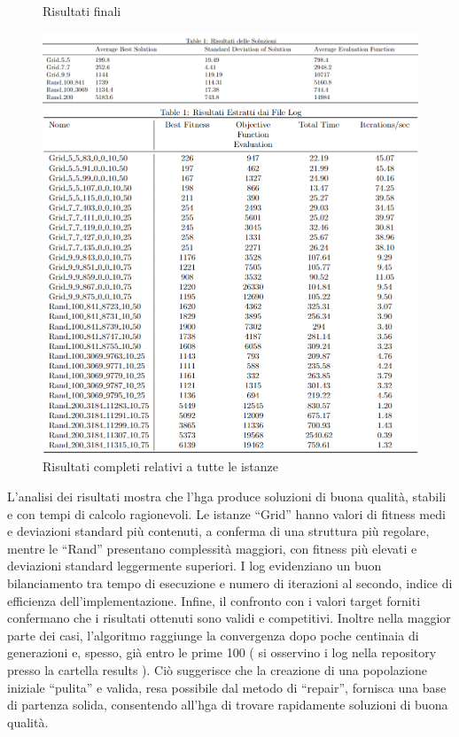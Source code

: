 \documentclass[12pt,a4paper,twoside]{article}
\begin{document}
\begin{figure}[H] 
    \centering
    \caption{Risultati finali}
    \includegraphics[width=\textwidth]{Screenshot 2025-03-03 120701.png} 
    \vspace{2pt} 
    \caption{Risultati completi relativi a tutte le istanze }
    \includegraphics[width=\textwidth]{Screenshot 2025-03-03 124139.png} 
\end{figure}
L’analisi dei risultati mostra che l’hga produce soluzioni di buona qualità, stabili e con tempi di calcolo ragionevoli. Le istanze “Grid” hanno valori di fitness medi e deviazioni standard più contenuti, a conferma di una struttura più regolare, mentre le “Rand” presentano complessità maggiori, con fitness più elevati e deviazioni standard leggermente superiori. I log evidenziano un buon bilanciamento tra tempo di esecuzione e numero di iterazioni al secondo, indice di efficienza dell’implementazione. Infine, il confronto con i valori target forniti confermano che i risultati ottenuti sono validi e competitivi.
Inoltre nella maggior parte dei casi, l’algoritmo raggiunge la convergenza dopo poche centinaia di generazioni e, spesso, già entro le prime 100 ( si osservino i log nella repository presso la cartella results ). Ciò suggerisce che la creazione di una popolazione iniziale “pulita” e valida, resa possibile dal metodo di “repair”, fornisca una base di partenza solida, consentendo all’hga di trovare rapidamente soluzioni di buona qualità.
\end{document}
